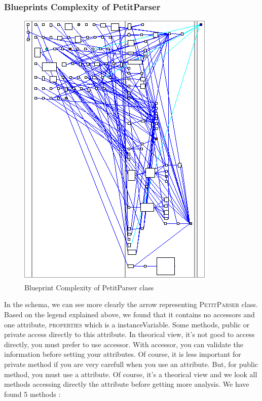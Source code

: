 \subsubsection{Blueprints Complexity of PetitParser}
\begin{figure}[ht]
\centering
\label{blueprint_pparser}
\includegraphics[scale=0.35]{blueprint_pparser.png}
\caption{Blueprint Complexity of PetitParser class}
\end{figure}
In the schema, we can see more clearly the arrow representing \textsc{PetitParser} class.\\
Based on the legend explained above, we found that it contains no accessors and one attribute, \textsc{properties} which is a instanceVariable.  Some methods, public or private access directly to this attribute.  In theorical view, it's not good to access directly, you must prefer to use accessor.  With accessor, you can validate the information before setting your attributes.  Of course, it is less important for private method if you are very carefull when you use an attribute.  But, for public method, you must use a attribute.
Of course, it's a theorical view and we look all methods accessing directly the attribute before getting more analysis.  We have found 5 methods : 
